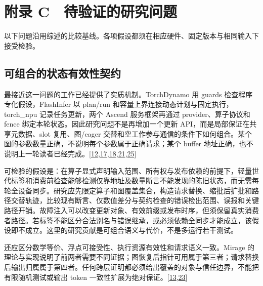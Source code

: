 \documentclass[
  UTF8,
  zihao=5]{ctexart}
\begin{document}
\hypertarget{ux9644ux5f55-c-ux5f85ux9a8cux8bc1ux7684ux7814ux7a76ux95eeux9898}{%
\section*{附录
C　待验证的研究问题}\label{ux9644ux5f55-c-ux5f85ux9a8cux8bc1ux7684ux7814ux7a76ux95eeux9898}}

以下问题沿用综述的比较基线。各项假设都须在相应硬件、固定版本与相同输入下接受检验。

\hypertarget{ux53efux7ec4ux5408ux7684ux72b6ux6001ux6709ux6548ux6027ux5951ux7ea6}{%
\subsection*{可组合的状态有效性契约}\label{ux53efux7ec4ux5408ux7684ux72b6ux6001ux6709ux6548ux6027ux5951ux7ea6}}

最接近这一问题的工作已经提供了实质机制。TorchDynamo 用 guards
检查程序专化假设，FlashInfer 以 plan/run
和容量上界连接动态计划与固定执行，torch\_npu 记录任务更新，两个 Ascend
服务框架再通过 provider、算子协议和 fence
绑定本轮状态。因此研究问题不是再增加一个更新
API，而是局部保证在共享元数据、slot 复用、图/eager
交替和空工作参与通信的条件下如何组合。某个图的参数数量正确，不说明每个参数属于正确请求；某个
buffer
地址正确，也不说明上一轮读者已经完成。{[}\protect\hyperlink{ref-ansel2024pytorch2}{12},\protect\hyperlink{ref-vllmascend2026impl}{17},\protect\hyperlink{ref-sglang2026impl}{18},\protect\hyperlink{ref-ye2025flashinfer}{21},\protect\hyperlink{ref-torchnpu2026graphs}{25}{]}

可检验的假设是：在算子显式声明输入范围、所有权与发布依赖的前提下，轻量世代标签和消费前检查能够检测仅靠地址及数量断言不能发现的陈旧状态，而无需每轮全设备同步。研究应先限定算子和图覆盖集合，构造请求替换、缩批后扩批和路径交替轨迹，比较现有断言、仅数值差分与契约检查的错误检出范围、误报和关键路径开销。故障注入可以改变更新对象、有效前缀或发布时序，但须保留真实消费者路径。若标签不能区分合法别名与错误继承，或必须依赖全同步才能成立，该假设即不成立。这里的研究贡献是可组合语义与代价，不是多运行若干测试。

还应区分数学等价、浮点可接受性、执行资源有效性和请求语义一致。Mirage
的理论与实现说明了前两者需要不同证据；图恢复后指针可用属于第三者；请求替换后输出归属属于第四者。任何跨层证明都必须给出覆盖的对象与信任边界，不能把有限随机测试或输出
token
一致性扩展为绝对保证。{[}\protect\hyperlink{ref-wu2025mirage}{13},\protect\hyperlink{ref-liu2026foundry}{23}{]}
\end{document}
